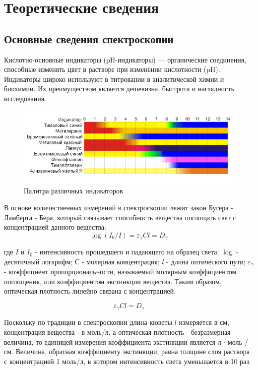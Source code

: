\documentclass[a4paper,12pt]{article}
\begin{document}
\section*{Теоретические сведения}

\subsection*{Основные сведения спектроскопии}
Кислотно-основные индикаторы (pH-индикаторы) — органические соединения, способные изменять цвет в растворе при изменении кислотности (pH). Индикаторы широко используют в титровании в аналитической химии и биохимии. Их преимуществом является дешевизна, быстрота и наглядность 
исследования.

\begin{figure}[H]
    \centering
    \includegraphics[scale=0.75]{Индикаторы.png}
    \centering
    \caption{Палитра различных индикаторов}
    \nonumber
\end{figure}

В основе количественных измерений в спектроскопии лежит закон Бугера - Ламберта - Бера, который связывает способность вещества поглощать свет с концентрацией данного вещества:
\begin{equation}
    \log(I_0/I) = \varepsilon_\gamma C l = D_\gamma
    \nonumber
\end{equation}

где $I$ и $I_0$ - интенсивность прошедшего и падающего на образец света; $\log$ - десятичный логарифм; $С$ - молярная концентрация; $l$ - длина оптического пути; $\varepsilon_\gamma$ - коэффициент пропорциональности, называемый молярным коэффициентом поглощения, или коэффициентом экстинкции вещества. Таким образом, оптическая плотность линейно связана с концентрацией:

\begin{equation}
    \varepsilon_\gamma C l = D_\gamma
    \nonumber
\end{equation}

Поскольку по традиции в спектроскопии длина кюветы $l$ измеряется в см, концентрация вещества - в моль/л, а оптическая плотность - безразмерная величина, то единицей измерения коэффициента экстинкции является л $\cdot$ моль / см. Величина, обратная коэффициенту экстинкции, равна толщине слоя раствора с концентрацией 1 моль/л, в котором интенсивность света уменьшается в 10 раз.
\end{document}
